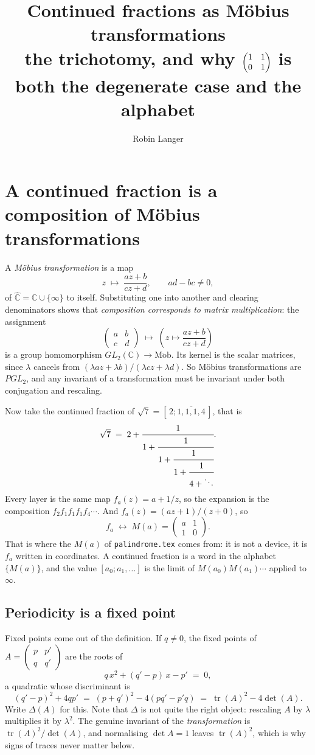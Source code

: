 \documentclass[12pt,a4paper]{article}
\title{Continued fractions as M\"obius transformations\\[0.4em]\large the trichotomy, and why $\protect\T$ is both the degenerate case and the alphabet}
\author{Robin Langer}
\date{}
\theoremstyle{plain}
\theoremstyle{definition}
\newcommand{\tr}{\operatorname{tr}}
\newcommand{\Mat}[4]{\begin{pmatrix} #1 & #2 \\ #3 & #4\end{pmatrix}}
\begin{document}
\maketitle
\vspace{-1.5em}

\section{A continued fraction is a composition of M\"obius transformations}

A \emph{M\"obius transformation} is a map
\[
  z \;\longmapsto\; \frac{az+b}{cz+d}, \qquad ad-bc \neq 0 ,
\]
of $\widehat{\mathbb{C}} = \mathbb{C}\cup\{\infty\}$ to itself. Substituting one into another and clearing denominators shows that \emph{composition corresponds to matrix multiplication}: the assignment
\[
  \Mat{a}{b}{c}{d} \;\longmapsto\; \left(z \mapsto \frac{az+b}{cz+d}\right)
\]
is a group homomorphism $GL_2(\mathbb{C}) \to \operatorname{M\ddot{o}b}$. Its kernel is the scalar matrices, since $\lambda$ cancels from $(\lambda a z + \lambda b)/(\lambda c z + \lambda d)$. So M\"obius transformations are $PGL_2$, and any invariant of a transformation must be invariant under both conjugation and rescaling.

Now take the continued fraction of $\sqrt 7 = [\,2;\overline{1,1,1,4}\,]$, that is
\[
  \sqrt 7 \;=\; 2 + \cfrac{1}{1+\cfrac{1}{1+\cfrac{1}{1+\cfrac{1}{4+\ddots}}}} .
\]
Every layer is the same map $f_a(z) = a + 1/z$, so the expansion is the composition $f_2 f_1 f_1 f_1 f_4 \cdots$. And $f_a(z) = (az+1)/(z+0)$, so
\[
  f_a \;\longleftrightarrow\; M(a) = \Mat{a}{1}{1}{0}.
\]
That is where the $M(a)$ of \texttt{palindrome.tex} comes from: it is not a device, it is $f_a$ written in coordinates. A continued fraction is a word in the alphabet $\{M(a)\}$, and the value $[a_0;a_1,\ldots]$ is the limit of $M(a_0)M(a_1)\cdots$ applied to $\infty$.

\subsection*{Periodicity is a fixed point}

Fixed points come out of the definition. If $q \neq 0$, the fixed points of $A = \Mat{p}{p'}{q}{q'}$ are the roots of
\begin{equation}\label{fix}
  q\,x^2 + (q'-p)\,x - p' \;=\; 0 ,
\end{equation}
a quadratic whose discriminant is
\[
  (q'-p)^2 + 4qp' \;=\; (p+q')^2 - 4(pq'-p'q) \;=\; \tr(A)^2 - 4\det(A) .
\]
Write $\Delta(A)$ for this. Note that $\Delta$ is not quite the right object: rescaling $A$ by $\lambda$ multiplies it by $\lambda^2$. The genuine invariant of the \emph{transformation} is $\tr(A)^2/\det(A)$, and normalising $\det A = 1$ leaves $\tr(A)^2$, which is why signs of traces never matter below.
\end{document}
